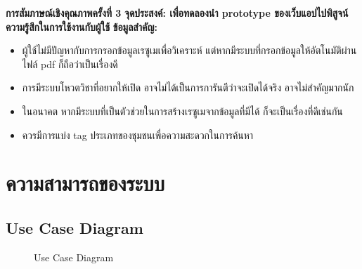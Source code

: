 \noindent\textbf{การสัมภาษณ์เชิงคุณภาพครั้งที่ 3}
\newline
\textbf{จุดประสงค์: เพื่อทดลองนำ prototype ของเว็บแอปไปพิสูจน์ความรู้สึกในการใช้งานกับผู้ใช้}
\newline
\textbf{ข้อมูลสำคัญ:}
\begin{itemize}
    \item ผู้ใช้ไม่มีปัญหากับการกรอกข้อมูลเรซูเมเพื่อวิเคราะห์ แต่หากมีระบบที่กรอกข้อมูลให้อัตโนมัติผ่านไฟล์ pdf ก็ถือว่าเป็นเรื่องดี
    \item การมีระบบโหวตวิชาที่อยากให้เปิด อาจไม่ได้เป็นการการันตีว่าจะเปิดได้จริง อาจไม่สำคัญมากนัก
    \item ในอนาคต หากมีระบบที่เป็นตัวช่วยในการสร้างเรซูเมจากข้อมูลที่มีได้ ก็จะเป็นเรื่องที่ดีเช่นกัน
    \item ควรมีการแบ่ง tag ประเภทของชุมชนเพื่อความสะดวกในการค้นหา
\end{itemize}


\section{ความสามารถของระบบ}
\subsection{Use Case Diagram}
\begin{figure}[H]\centering
    \setlength{\fboxrule}{0.2mm} %
    \setlength{\fboxsep}{0.5cm}
    \caption{Use Case Diagram}\label{fig:usecase}
\end{figure}
